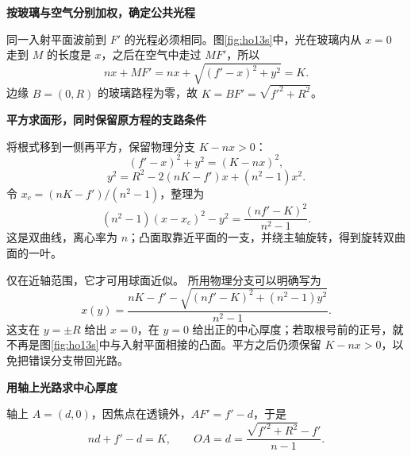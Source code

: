 \begin{solution}\textbf{按玻璃与空气分别加权，确定公共光程}\par\nobreak
同一入射平面波前到 $F'$ 的光程必须相同。图\ref{fig:ho13s}中，光在玻璃内从 $x=0$ 走到 $M$ 的长度是 $x$，之后在空气中走过 $MF'$，所以
\[
nx+MF'=nx+\sqrt{(f'-x)^2+y^2}=K.
\]
边缘 $B=(0,R)$ 的玻璃路程为零，故 $K=BF'=\sqrt{f'^2+R^2}$。



\par\medskip{}\noindent\textbf{平方求面形，同时保留原方程的支路条件}\par\nobreak
将根式移到一侧再平方，保留物理分支 $K-nx>0$：
\[
(f'-x)^2+y^2=(K-nx)^2,
\]
\[
\boxed{y^2=R^2-2(nK-f')x+(n^2-1)x^2.}
\]
令 $x_c=(nK-f')/(n^2-1)$，整理为
\[
(n^2-1)(x-x_c)^2-y^2
=\frac{(nf'-K)^2}{n^2-1}.
\]
这是双曲线，离心率为 $n$；凸面取靠近平面的一支，并绕主轴旋转，得到旋转双曲面的一叶。

仅在近轴范围，它才可用球面近似。
所用物理分支可以明确写为
\[
\boxed{x(y)=\frac{nK-f'-\sqrt{(nf'-K)^2+(n^2-1)y^2}}{n^2-1}.}
\]
这支在 $y=\pm R$ 给出 $x=0$，在 $y=0$ 给出正的中心厚度；若取根号前的正号，就不再是图\ref{fig:ho13s}中与入射平面相接的凸面。平方之后仍须保留 $K-nx>0$，以免把错误分支带回光路。



\par\medskip{}\noindent\textbf{用轴上光路求中心厚度}\par\nobreak
轴上 $A=(d,0)$，因焦点在透镜外，$AF'=f'-d$，于是
\[
nd+f'-d=K,\qquad
\boxed{OA=d=\frac{\sqrt{f'^2+R^2}-f'}{n-1}.}
\]




\end{solution}
